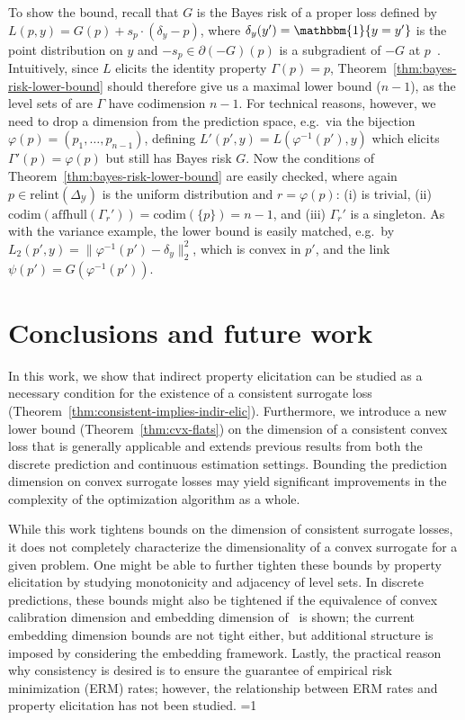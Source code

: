 \documentclass{article}
\newcommand{\Comments}{1}
\newcommand{\mytodo}[2]{\ifnum\Comments=1%
	\todo[linecolor=#1!80!black,backgroundcolor=#1,bordercolor=#1!80!black]{#2}\fi}
\newcommand{\btw}[1]{\mytodo{gray!10!white}{\textcolor{gray}{BTW: #1}}}%
\newcommand{\simplex}{\Delta_\Y}
\newcommand{\relint}[1]{\mathrm{relint}(#1)}
\newcommand{\codim}{\mathrm{codim}}
\newcommand{\affhull}{\mathrm{affhull}}
\newcommand{\Y}{\mathcal{Y}}
\newcommand{\ones}{\mathbbm{1}}
\begin{document}
To show the bound, recall that $G$ is the Bayes risk of a proper loss defined by $L(p,y) = G(p) + s_p \cdot (\delta_y - p)$, where $\delta_y(y') = \ones\{y=y'\}$ is the point distribution on $y$ and $-s_p \in \partial (-G)(p)$ is a subgradient of $-G$ at $p$~\citep{gneiting2007strictly,reid2009surrogate,frongillo2014general}.
Intuitively, since $L$ elicits the identity property $\Gamma(p)=p$, Theorem~\ref{thm:bayes-risk-lower-bound} should therefore give us a maximal lower bound ($n-1$), as the level sets of are $\Gamma$ have codimension $n-1$.
For technical reasons, however, we need to drop a dimension from the prediction space, e.g.\ via the bijection $\varphi(p) = (p_1,\ldots,p_{n-1})$, defining $L'(p',y) = L(\varphi^{-1}(p'),y)$ which elicits $\Gamma'(p) = \varphi(p)$ but still has Bayes risk $G$.
Now the conditions of Theorem~\ref{thm:bayes-risk-lower-bound} are easily checked, where again $p\in\relint\simplex$ is the uniform distribution and $r=\varphi(p)$: (i) is trivial, (ii) $\codim(\affhull(\Gamma_r')) = \codim(\{p\}) = n-1$, and (iii) $\Gamma_r'$ is a singleton.
As with the variance example, the lower bound is easily matched, e.g.\ by $L_2(p',y) = \|\varphi^{-1}(p')-\delta_y\|_2^2$, which is convex in $p'$, and the link $\psi(p') = G(\varphi^{-1}(p'))$.


\section{Conclusions and future work}\label{sec:conclusions}
In this work, we show that indirect property elicitation can be studied as a necessary condition for the existence of a consistent surrogate loss (Theorem~\ref{thm:consistent-implies-indir-elic}).
Furthermore, we introduce a new lower bound (Theorem~\ref{thm:cvx-flats}) on the dimension of a consistent convex loss that is generally applicable and extends previous results from both the discrete prediction and continuous estimation settings.
Bounding the prediction dimension on convex surrogate losses may yield significant improvements in the complexity of the optimization algorithm as a whole.

While this work tightens bounds on the dimension of consistent surrogate losses, it does not completely characterize the dimensionality of a convex surrogate for a given problem.
One might be able to further tighten these bounds by property elicitation by studying monotonicity and adjacency of level sets.
In discrete predictions, these bounds might also be tightened if the equivalence of convex calibration dimension and embedding dimension of~\citet{finocchiaro2020embedding} is shown; the current embedding dimension bounds are not tight either, but additional structure is imposed by considering the embedding framework.
Lastly, the practical reason why consistency is desired is to ensure the guarantee of empirical risk minimization (ERM) rates; however, the relationship between ERM rates and property elicitation has not been studied.
\btw{Infinite $\Y$}
\end{document}
